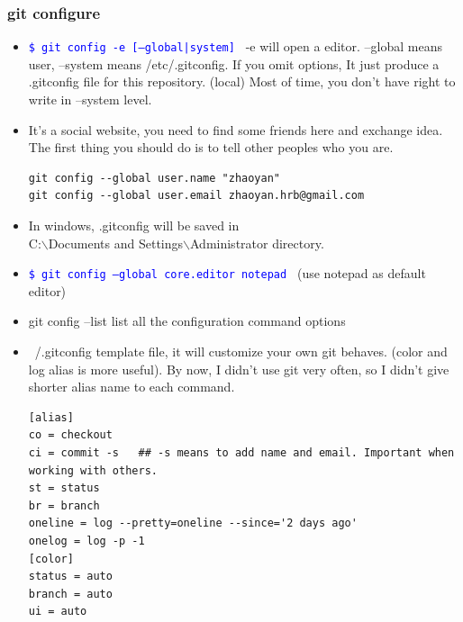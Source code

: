 \documentclass[a4paper,12pt,twoside]{book}
\newcommand{\linuxcommand}[1]{\texttt{\textcolor{blue}{\$ #1 \Pisymbol{psy}{191}}}}
\begin{document}
\subsubsection{git configure}
    \begin{itemize}

  \item \linuxcommand{git config -e [--global|system]}  -e will open a editor. --global means user, --system means /etc/.gitconfig.   If you omit options, It just produce a .gitconfig file for this repository. (local) Most of time, you don't have right to write in --system level. 

\item It's a social website, you need to find some friends here and exchange idea. The first thing you should do is to tell other peoples who you are.  
\begin{verbatim}
git config --global user.name "zhaoyan"
git config --global user.email zhaoyan.hrb@gmail.com
\end{verbatim}

    \item In windows, .gitconfig will be saved in  \\
    C:$\backslash$Documents and Settings$\backslash$Administrator directory.
    \item \linuxcommand{git config --global core.editor notepad} (use notepad as default editor)
    \item git config --list list all the configuration command options
 

\item  ~/.gitconfig template file, it will customize your own git behaves. (color and log alias is more useful). By now, I didn't use git very often, so I didn't give shorter alias name to each command.

\begin{verbatim}
[alias]
co = checkout
ci = commit -s   ## -s means to add name and email. Important when working with others.
st = status
br = branch
oneline = log --pretty=oneline --since='2 days ago'
onelog = log -p -1
[color]
status = auto
branch = auto
ui = auto
\end{verbatim}


\end{itemize}
\end{document}
